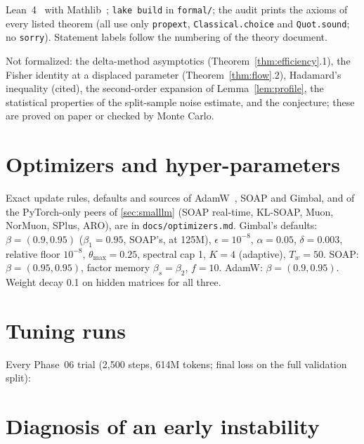 Lean~4~\citep{demoura2021lean4} with Mathlib~\citep{mathlib2020}; \texttt{lake build} in
\texttt{formal/}; the audit prints the axioms of every listed theorem (all \LeanCount{} use only
\texttt{propext}, \texttt{Classical.choice} and \texttt{Quot.sound}; no \texttt{sorry}). Statement
labels follow the numbering of the theory document.

\begin{center}\scriptsize

\end{center}

Not formalized: the delta-method asymptotics (Theorem~\ref{thm:efficiency}.1), the Fisher identity
at a displaced parameter (Theorem~\ref{thm:flow}.2), Hadamard's inequality (cited), the
second-order expansion of Lemma~\ref{lem:profile}, the statistical properties of the split-sample
noise estimate, and the conjecture; these are proved on paper or checked by Monte Carlo.

\section{Optimizers and hyper-parameters}
\label{app:optimizers}

Exact update rules, defaults and sources of AdamW~\citep{loshchilov2019adamw}, SOAP and Gimbal, and
of the PyTorch-only peers of \cref{sec:smalllm} (SOAP real-time, KL-SOAP, Muon, NorMuon, SPlus,
ARO), are in \texttt{docs/optimizers.md}. Gimbal's defaults: $\beta=(0.9,0.95)$ ($\beta_1=0.95$, SOAP's, at 125M),
$\epsilon=10^{-8}$, $\alpha=0.05$, $\delta=0.003$, relative floor $10^{-8}$, $\theta_{\max}=0.25$, spectral
cap 1, $K=4$ (adaptive), $T_w=50$. SOAP: $\beta=(0.95,0.95)$, factor memory $\beta_s=\beta_2$,
$f=10$. AdamW: $\beta=(0.9,0.95)$. Weight decay 0.1 on hidden matrices for all three.

\section{Tuning runs}
\label{app:tuning}

Every Phase~06 trial (2{,}500 steps, 614M tokens; final loss on the full validation split):

\begin{center}\scriptsize

\end{center}

\section{Diagnosis of an early instability}
\label{app:diag}

